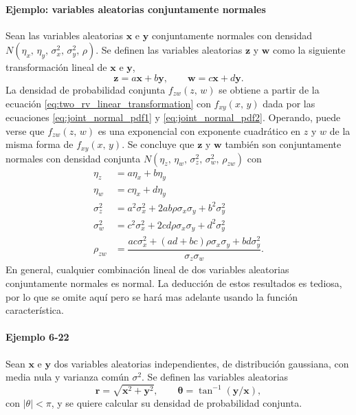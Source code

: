 \documentclass[a4paper]{report}
\newcommand{\x}{\mathbf{x}}
\newcommand{\y}{\mathbf{y}}
\newcommand{\w}{\mathbf{w}}
\newcommand{\z}{\mathbf{z}}
\begin{document}
\paragraph{Ejemplo: variables aleatorias conjuntamente normales}

Sean las variables aleatorias \(\x\) e \(\y\) conjuntamente normales con densidad \(N(\eta_x,\,\eta_y,\,\sigma_x^2,\,\sigma_y^2,\,\rho)\). Se definen las variables aleatorias \(\z\) y \(\w\) como la siguiente transformación lineal de \(\x\) e \(\y\),
\[
 \z=a\x+b\y,\qquad \w=c\x+d\y.
\]
La densidad de probabilidad conjunta \(f_{zw}(z,\,w)\) se obtiene a partir de la ecuación \ref{eq:two_rv_linear_transformation} con \(f_{xy}(x,\,y)\) dada por las ecuaciones \ref{eq:joint_normal_pdf1} y \ref{eq:joint_normal_pdf2}. Operando, puede verse que \(f_{zw}(z,\,w)\) es una exponencial con exponente cuadrático en \(z\) y \(w\) de la misma forma de \(f_{xy}(x,\,y)\). Se concluye que \(\z\) y \(\w\) también son conjuntamente normales con densidad conjunta \(N(\eta_z,\,\eta_w,\,\sigma_z^2,\,\sigma_w^2,\,\rho_{zw})\) con
\begin{equation}\label{eq:jointly_normal_linear_transformation}
 \begin{aligned}
 \eta_z&=a\eta_x+b\eta_y\\
 \eta_w&=c\eta_x+d\eta_y\\
 \sigma_z^2&=a^2\sigma_x^2+2ab\rho\sigma_x\sigma_y+b^2\sigma_y^2\\
 \sigma_w^2&=c^2\sigma_x^2+2cd\rho\sigma_x\sigma_y+d^2\sigma_y^2\\
 \rho_{zw}&=\dfrac{ac\sigma_x^2+(ad+bc)\rho\sigma_x\sigma_y+bd\sigma_y^2}{\sigma_z\sigma_w}.
\end{aligned}
\end{equation}
En general, cualquier combinación lineal de dos variables aleatorias conjuntamente normales es normal. La deducción de estos resultados es tediosa, por lo que se omite aquí pero se hará mas adelante usando la función característica.


\paragraph{Ejemplo 6-22} Sean \(\x\) e \(\y\) dos variables aleatorias independientes, de distribución gaussiana, con media nula y varianza común \(\sigma^2\). Se definen las variables aleatorias
\begin{equation}\label{eq:magnitude_and_phase_rv}
 \mathbf{r}=\sqrt{\x^2+\y^2}, \qquad\bm{\theta}=\tan^{-1}(\y/\x),
\end{equation}
con \(|\theta|<\pi\), y se quiere calcular su densidad de probabilidad conjunta.
\end{document}
